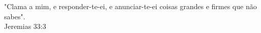 \begin{epigrafe}
  \vspace*{\fill}
  \begin{otherlanguage}{english}
    \begin{flushright}
      \begin{SingleSpace}
      "Clama a mim, e responder-te-ei, e anunciar-te-ei coisas grandes e firmes que não sabes".\\ 
      Jeremias 33:3
      \end{SingleSpace}
    \end{flushright}
  \end{otherlanguage}
\end{epigrafe}
